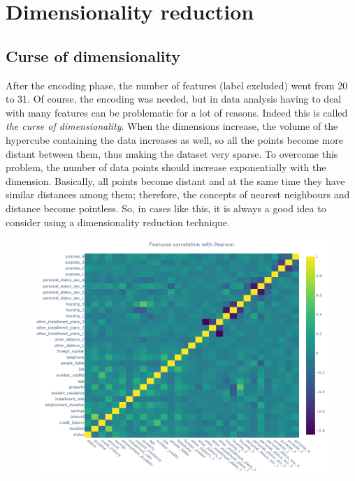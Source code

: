 \documentclass[letterpaper]{article}
\begin{document}
	\section{Dimensionality reduction} \label{dim_reduction}
	\subsection{Curse of dimensionality}
	After the encoding phase, the number of features (label excluded) went from 20 to 31. Of course, the encoding was needed, but in data analysis having to deal with many features can be problematic for a lot of reasons. Indeed this is called \emph{the curse of dimensionality}. When the dimensions increase, the volume of the hypercube containing the data increases as well, so all the points become more distant between them, thus making the dataset very sparse. To overcome this problem, the number of data points should increase exponentially with the dimension. Basically, all points become distant and at the same time they have similar distances among them; therefore, the concepts of nearest neighbours and distance become pointless. So, in cases like this, it is always a good idea to consider using a dimensionality reduction technique. 
	\begin{figure}[h]
		\centering
		\includegraphics[width=.8\textwidth]{images/correlation_pearson.png}
		\label{fig:12}
	\end{figure}
\end{document}
